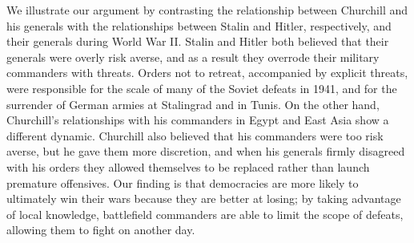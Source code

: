 \documentclass[11pt,]{article}
\begin{document}
We illustrate our argument by contrasting the relationship between Churchill and his generals with the relationships between Stalin and Hitler, respectively, and their generals during World War II.  Stalin and Hitler both believed that their generals were overly risk averse, and as a result they overrode their military commanders with threats.  Orders not to retreat, accompanied by explicit threats, were responsible for the scale of many of the Soviet defeats in 1941, and for the surrender of German armies at Stalingrad and in Tunis.  On the other hand, Churchill's relationships with his commanders in Egypt and East Asia show a different dynamic.  Churchill also believed that his commanders were too risk averse, but he gave them more discretion, and when his generals firmly disagreed with his orders they allowed themselves to be replaced rather than launch premature offensives.  Our finding is that democracies are more likely to ultimately win their wars because they are better at losing; by taking advantage of local knowledge, battlefield commanders are able to limit the scope of defeats, allowing them to fight on another day.



\end{document}
